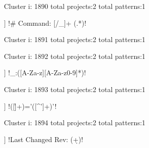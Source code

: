 Cluster i: 1890
total projects:2
total patterns:1
\begin{multicols}{1}
\begin{description}[noitemsep,topsep=0pt]
\item [[2] ] \cverb!# Command: [/\w_]+ (.*)!
\end{description}
\end{multicols}







Cluster i: 1891
total projects:2
total patterns:1
\begin{multicols}{1}
\end{multicols}







Cluster i: 1892
total projects:2
total patterns:1
\begin{multicols}{1}
\begin{description}[noitemsep,topsep=0pt]
\item [[2] ] \cverb!_:([A-Za-z][A-Za-z0-9]*)!
\end{description}
\end{multicols}







Cluster i: 1893
total projects:2
total patterns:1
\begin{multicols}{1}
\begin{description}[noitemsep,topsep=0pt]
\item [[2] ] \cverb!([\w\-\.]+)='([^']+)'!
\end{description}
\end{multicols}







Cluster i: 1894
total projects:2
total patterns:1
\begin{multicols}{1}
\begin{description}[noitemsep,topsep=0pt]
\item [[2] ] \cverb!Last Changed Rev: (\d+)!
\end{description}
\end{multicols}







